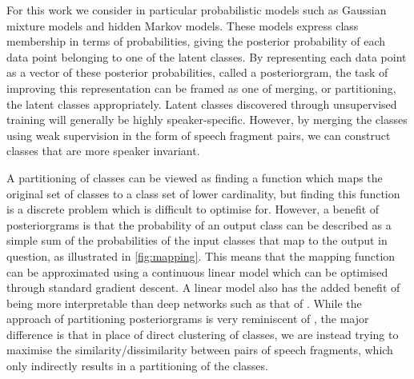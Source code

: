 For this work we consider in particular probabilistic models such as Gaussian mixture models and hidden Markov models.
These models express class membership in terms of probabilities, giving the posterior probability of each data point belonging to one of the latent classes.
By representing each data point as a vector of these posterior probabilities, called a posteriorgram, the task of improving this representation can be framed as one of merging, or partitioning, the latent classes appropriately.
Latent classes discovered through unsupervised training will generally be highly speaker-specific.
However, by merging the classes using weak supervision in the form of speech fragment pairs, we can construct classes that are more speaker invariant.

A partitioning of classes can be viewed as finding a function which maps the original set of classes to a class set of lower cardinality, but finding this function is a discrete problem which is difficult to optimise for.
However, a benefit of posteriorgrams is that the probability of an output class can be described as a simple sum of the probabilities of the input classes that map to the output in question, as illustrated in \cref{fig:mapping}.
This means that the mapping function can be approximated using a continuous linear model which can be optimised through standard gradient descent.
A linear model also has the added benefit of being more interpretable than deep networks such as that of \textcite{thiolliere2015hybrid}.
While the approach of partitioning posteriorgrams is very reminiscent of \textcite{jansen2013weak}, the major difference is that in place of direct clustering of classes, we are instead trying to maximise the similarity/dissimilarity between pairs of speech fragments, which only indirectly results in a partitioning of the classes.

